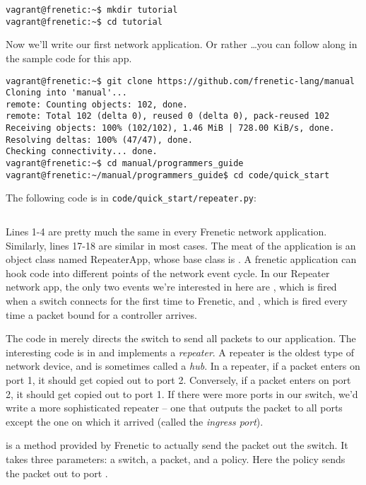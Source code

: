 \begin{verbatim}
vagrant@frenetic:~$ mkdir tutorial
vagrant@frenetic:~$ cd tutorial
\end{verbatim}

Now we'll write our first network application.
Or rather \ldots you can follow along in the sample code for this app.  

\begin{verbatim}
vagrant@frenetic:~$ git clone https://github.com/frenetic-lang/manual
Cloning into 'manual'...
remote: Counting objects: 102, done.
remote: Total 102 (delta 0), reused 0 (delta 0), pack-reused 102
Receiving objects: 100% (102/102), 1.46 MiB | 728.00 KiB/s, done.
Resolving deltas: 100% (47/47), done.
Checking connectivity... done.
vagrant@frenetic:~$ cd manual/programmers_guide
vagrant@frenetic:~/manual/programmers_guide$ cd code/quick_start
\end{verbatim}

The following code is in \texttt{code/quick\_start/repeater.py}:

\inputminted[linenos]{python}{code/quick_start/repeater.py}

Lines 1-4 are pretty much the same in every Frenetic network application.
Similarly, lines 17-18 are similar in most cases. 
 The meat of the application is an object class named RepeaterApp, whose base class is .
A frenetic application can hook code into different points of the network event cycle.
In our Repeater network app, the only two events we're interested in here are
, which is fired when a switch connects for the first time to Frenetic, and 
 , which is fired every time a packet
bound for a controller arrives.

The code in  merely directs the switch to send all packets to our application.
The interesting code is in  and implements a {\it repeater}.
A repeater is the oldest type of network device, and is sometimes called a {\it hub}. 
In a repeater, if a packet enters on port 1, it should get copied out to port 2.  
Conversely, if a packet enters on port 2, it should get copied out to port 1.
If there were more ports in our switch, we'd write a more sophisticated repeater -- one that
outputs the packet to all ports except the one on which it arrived (called the {\it ingress port}).  

 is a method provided by Frenetic to actually send the packet out the switch.  It takes three 
parameters: a switch, a packet, and a policy.  
Here the policy sends the packet out to port .   

